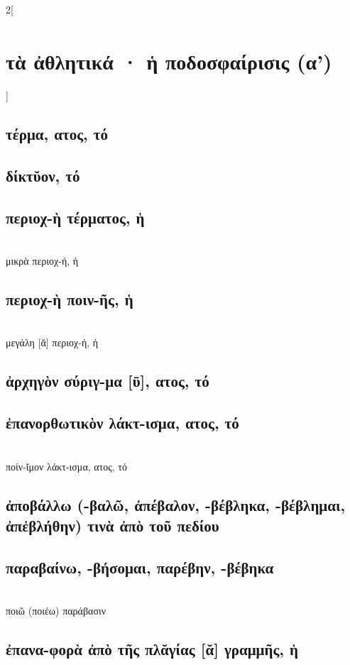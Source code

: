 \documentclass{book}
\begin{document}
\begin{multicols}{2}[\section{τὰ ἀθλητικά · ἡ ποδοσφαίρισις\textsuperscript{\textdagger} (α')}]
\subsection{τέρμα, ατος, τό}
\subsection{δίκτῠον, τό}
\subsection{περιοχ-ὴ τέρματος, ἡ}
 ~\\
μικρὰ περιοχ-ή, ἡ
\subsection{περιοχ-ὴ ποιν-ῆς, ἡ}
 ~\\
μεγάλη [ᾰ] περιοχ-ή, ἡ
\subsection{ἀρχηγὸν σύριγ-μα [ῡ], ατος, τό}
\subsection{ἐπανορθωτικὸν λάκτ-ισμα, ατος, τό}
 ~\\
ποίν-ῐμον λάκτ-ισμα, ατος, τό
\subsection{ἀποβάλλω (-βαλῶ, ἀπέβαλον, -βέβληκα, -βέβλημαι, ἀπἐβλήθην) τινὰ ἀπὸ τοῦ πεδίου}
\subsection{παραβαίνω, -βήσομαι, παρέβην, -βέβηκα}
 ~\\
ποιῶ (ποιέω) παράβασιν
\subsection{ἐπανα-φορὰ ἀπὸ τῆς πλᾰγίας [ᾰ] γραμμῆς, ἡ}
~
\end{multicols}
\end{document}
